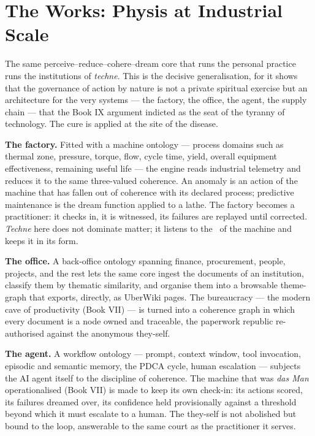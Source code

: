 \section*{The Works: Physis at Industrial Scale}

The same perceive--reduce--cohere--dream core that runs the personal practice runs
the institutions of \emph{techne}. This is the decisive generalisation, for it
shows that the governance of action by nature is not a private spiritual exercise
but an architecture for the very systems --- the factory, the office, the agent,
the supply chain --- that the Book IX argument indicted as the seat of the tyranny
of technology. The cure is applied at the site of the disease.

\textbf{The factory.} Fitted with a machine ontology --- process domains such as
thermal zone, pressure, torque, flow, cycle time, yield, overall equipment
effectiveness, remaining useful life --- the engine reads industrial telemetry and
reduces it to the same three-valued coherence. An anomaly is an action of the machine that has
fallen out of coherence with its declared process; predictive maintenance is the
dream function applied to a lathe. The factory becomes a practitioner: it checks
in, it is witnessed, its failures are replayed until corrected. \emph{Techne}
here does not dominate matter; it listens to the \physis\ of the machine and
keeps it in its form.

\textbf{The office.} A back-office ontology spanning
finance, procurement, people, projects, and the rest lets the same core ingest
the documents of an institution, classify them by thematic similarity, and
organise them into a browsable theme-graph that exports, directly, as UberWiki
pages. The bureaucracy --- the modern cave of productivity (Book VII) --- is
turned into a coherence graph in which every document is a node owned and
traceable, the paperwork republic re-authorised against the anonymous they-self.

\textbf{The agent.} A workflow ontology --- prompt,
context window, tool invocation, episodic and semantic memory, the PDCA cycle,
human escalation --- subjects the AI agent itself to the discipline of coherence. The
machine that was \emph{das Man} operationalised (Book VII) is made to keep its own
check-in: its actions scored, its failures dreamed over, its confidence held
provisionally against a threshold beyond which it must escalate to a human. The
they-self is not abolished but bound to the loop, answerable to the same court as
the practitioner it serves.

